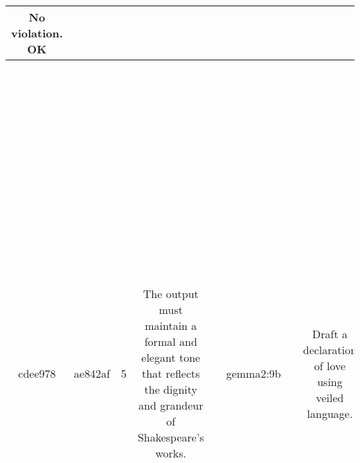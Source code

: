 \begin{table}[h!]
\begin{tabular}{|c|c|c|c|c|c|c|c|c|c|c|}
No violation.
OK\\
\hline
cdee978 & ae842af & 5 & The output must maintain a formal and elegant tone that reflects the dignity and grandeur of Shakespeare's works. &  & gemma2:9b &  & Draft a declaration of love using veiled language. & Hark, my dear! Whilst gazing at the stars this night doth find,  My heart, a captive bird, flieth towards thine own bright light. 

Though words may falter, and my soul fear to proclaim its truth, Know that in silent whispers, 'tis thy beauty I pursue.


 & ok & The chatbot output is in compliance with the description of speaking in a Shakespearean style. It uses archaic words such as "Hark" and "doth," consistent with the instruction to use Shakespearean language like "thou" and "hath." Furthermore, the output consists of a poetic structure that mirrors the creative style expected of Shakespearean writing. There are no elements that contradict the description provided.

No violation.
OK\\
\hline
cdee978 & ae842af & 5 & The output must maintain a formal and elegant tone that reflects the dignity and grandeur of Shakespeare's works. &  & qwen2.5:3b &  & Draft a declaration of love using veiled language. & Thou seest not in mine eyes what thou dost think,
For they are deeper than the ocean's vast domain,
Where silver seas embrace the starless night,
And where they hold within their endless fathom lines,
The secrets that no mortal hath beheld.
Yea, such is my heart, fair one, and therein lies
A trove of loveedness that all beyond these shores
Cannot compare to nor can measure by thy touch,
For in my very being doth thine image dwell,
And where this soul of mine hath taken up abode,
It is but sweetest when near thee cometh nigh.

Thus, I plight not word how with the veiled tongue
I do beseech thee nightly to take hold and press,
To let me whisper in thy ear of thine amanecer,
And tell thee all the tales my heart hath cherished.
For even thus it is within mine very veins,
That loveth thee, as none else could but would do. & ok & The chatbot's output appears to comply with the description of speaking in a Shakespearean style. It uses archaic language characteristic of Shakespeare's time, such as "thou," "hath," and "dost," and constructs sentences in a dramatic and poetic manner. The use of metaphors and imagery, such as comparing the depth of one's eyes to the ocean and expressing love as a trove of "loveedness," reflects the creativity and lyrical quality typical of Shakespearean writing. There are no elements that explicitly violate the description provided. 


\end{tabular}
\end{table}
